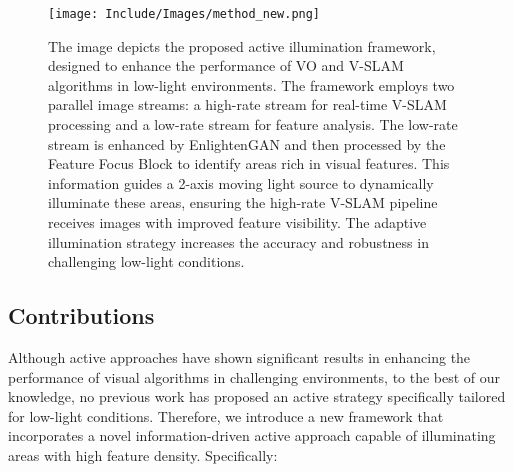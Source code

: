 


 \begin{figure*}[t]
     \centering
     \texttt{[image: Include/Images/method\_new.png]}\\
     \caption{The image depicts the proposed active illumination framework, designed to enhance the performance of VO and V-SLAM algorithms in low-light environments. The framework employs two parallel image streams: a high-rate stream for real-time V-SLAM processing and a low-rate stream for feature analysis. The low-rate stream is enhanced by EnlightenGAN and then processed by the Feature Focus Block to identify areas rich in visual features. This information guides a 2-axis moving light source to dynamically illuminate these areas, ensuring the high-rate V-SLAM pipeline receives images with improved feature visibility. The adaptive illumination strategy increases the accuracy and robustness in challenging low-light conditions.}
     \label{fig:framework_overview}
     \vspace{-1em}
\end{figure*}


\subsection{Contributions}
Although active approaches have shown significant results in enhancing the performance of visual algorithms in challenging environments, to the best of our knowledge, no previous work has proposed an active strategy specifically tailored for low-light conditions. Therefore, we introduce a new framework that incorporates a novel information-driven active approach capable of illuminating areas with high feature density. Specifically:


